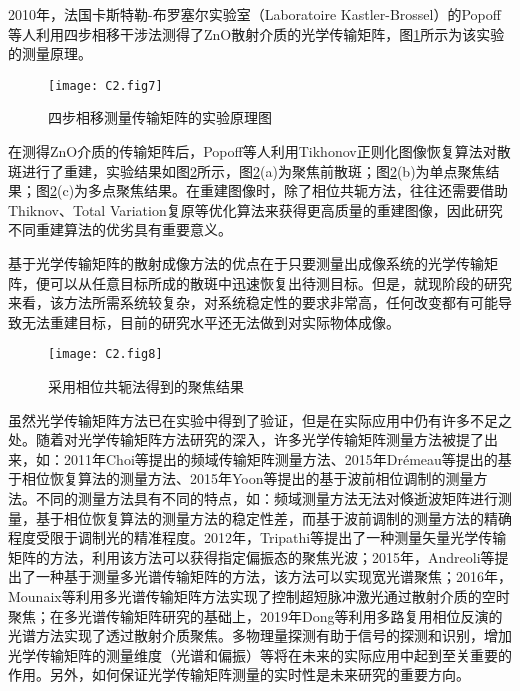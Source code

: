 2010年，法国卡斯特勒-布罗塞尔实验室（Laboratoire Kastler-Brossel）的Popoff等人\cite{Popoff2010}利用四步相移干涉法测得了ZnO散射介质的光学传输矩阵，图\ref{fig2:7}所示为该实验的测量原理\cite{Popoff2010}。

\begin{figure}[htp]
	\centering
	\texttt{[image: C2.fig7]}
	\caption{四步相移测量传输矩阵的实验原理图}
	\label{fig2:7}
\end{figure}

在测得ZnO介质的传输矩阵后，Popoff等人\cite{Popoff2010}利用Tikhonov正则化图像恢复算法对散斑进行了重建，实验结果如图\ref{fig2:8}所示\cite{Popoff2010}，图\ref{fig2:8}(a)为聚焦前散斑；图\ref{fig2:8}(b)为单点聚焦结果；图\ref{fig2:8}(c)为多点聚焦结果。在重建图像时，除了相位共轭方法，往往还需要借助Thiknov、Total Variation复原等优化算法来获得更高质量的重建图像，因此研究不同重建算法的优劣具有重要意义\cite{popoff_controlling_2011}。

基于光学传输矩阵的散射成像方法的优点在于只要测量出成像系统的光学传输矩阵，便可以从任意目标所成的散斑中迅速恢复出待测目标。但是，就现阶段的研究来看，该方法所需系统较复杂，对系统稳定性的要求非常高，任何改变都有可能导致无法重建目标，目前的研究水平还无法做到对实际物体成像。

\begin{figure}[htp]
	\centering
	\texttt{[image: C2.fig8]}
	\caption{采用相位共轭法得到的聚焦结果}
	\label{fig2:8}
\end{figure}

虽然光学传输矩阵方法已在实验中得到了验证，但是在实际应用中仍有许多不足之处。随着对光学传输矩阵方法研究的深入，许多光学传输矩阵测量方法被提了出来，如：2011年Choi等\cite{choi_overcoming_2011}提出的频域传输矩阵测量方法、2015年Drémeau等\cite{remeau_reference_less_2015}提出的基于相位恢复算法的测量方法、2015年Yoon等\cite{yoon_measuring_2015}提出的基于波前相位调制的测量方法。不同的测量方法具有不同的特点，如：频域测量方法无法对倏逝波矩阵进行测量，基于相位恢复算法的测量方法的稳定性差，而基于波前调制的测量方法的精确程度受限于调制光的精准程度。2012年，Tripathi等\cite{tripathi_vector_2012}提出了一种测量矢量光学传输矩阵的方法，利用该方法可以获得指定偏振态的聚焦光波；2015年，Andreoli等\cite{andreoli_deterministic_2015}提出了一种基于测量多光谱传输矩阵的方法，该方法可以实现宽光谱聚焦；2016年，Mounaix等\cite{mounaix_spatiotemporal_2016}利用多光谱传输矩阵方法实现了控制超短脉冲激光通过散射介质的空时聚焦；在多光谱传输矩阵研究的基础上，2019年Dong等\cite{dong_spectral_2019}利用多路复用相位反演的光谱方法实现了透过散射介质聚焦。多物理量探测有助于信号的探测和识别，增加光学传输矩阵的测量维度（光谱和偏振）等将在未来的实际应用中起到至关重要的作用。另外，如何保证光学传输矩阵测量的实时性是未来研究的重要方向。

